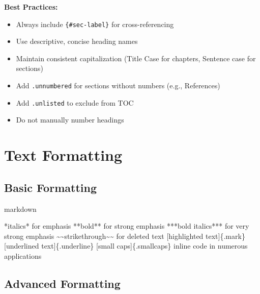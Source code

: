 \documentclass[
  11pt,
  letterpaper,
]{book}
\newenvironment{Shaded}{\begin{snugshade}}{\end{snugshade}}
\newcommand{\CommentTok}[1]{\textcolor[rgb]{0.37,0.37,0.37}{#1}}
\newcommand{\InformationTok}[1]{\textcolor[rgb]{0.37,0.37,0.37}{#1}}
\newcommand{\NormalTok}[1]{\textcolor[rgb]{0.00,0.23,0.31}{#1}}
\newcommand{\OtherTok}[1]{\textcolor[rgb]{0.00,0.23,0.31}{#1}}
\providecommand{\tightlist}{%
  \setlength{\itemsep}{0pt}\setlength{\parskip}{0pt}}
\begin{document}
\textbf{Best Practices:}

\begin{itemize}
\tightlist
\item
  Always include \texttt{\{\#sec-label\}} for cross-referencing
\item
  Use descriptive, concise heading names
\item
  Maintain consistent capitalization (Title Case for chapters, Sentence
  case for sections)
\item
  Add \texttt{.unnumbered} for sections without numbers (e.g.,
  References)
\item
  Add \texttt{.unlisted} to exclude from TOC
\item
  Do not manually number headings
\end{itemize}

\section*{Text Formatting}\label{text-formatting}


\subsection*{Basic Formatting}\label{basic-formatting}

markdown

\begin{Shaded}
\begin{Highlighting}[]
\NormalTok{*italics* for emphasis}
\NormalTok{**bold** for strong emphasis}
\NormalTok{***bold italics*** for very strong emphasis}
\NormalTok{\textasciitilde{}\textasciitilde{}strikethrough\textasciitilde{}\textasciitilde{} for deleted text}
\CommentTok{[}\OtherTok{highlighted text}\CommentTok{]}\NormalTok{\{.mark\}}
\CommentTok{[}\OtherTok{underlined text}\CommentTok{]}\NormalTok{\{.underline\}}
\CommentTok{[}\OtherTok{small caps}\CommentTok{]}\NormalTok{\{.smallcaps\}}
\InformationTok{\textasciigrave{}inline code\textasciigrave{}}\NormalTok{ in numerous applications}
\end{Highlighting}
\end{Shaded}

\subsection*{Advanced Formatting}\label{advanced-formatting}
\end{document}
